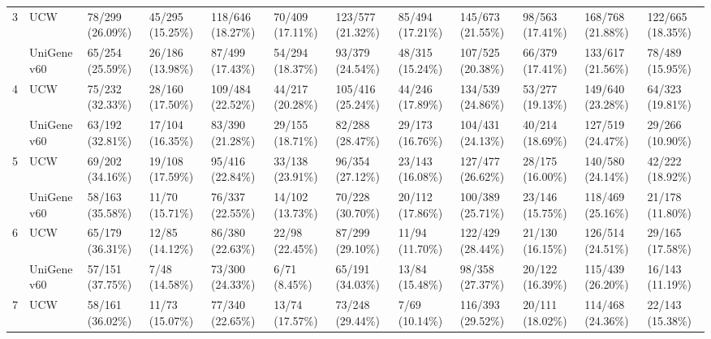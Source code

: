 \begin{sidewaystable}
\begin{localsize}{6}{7}
\begin{tabular}{llp{1cm}p{1cm}p{1cm}p{1cm}p{1cm}p{1cm}p{1cm}p{1cm}p{1cm}p{1cm}}
 \midrule
 3          & UCW         & 78/299 (26.09\%)   & 45/295 (15.25\%)   & 118/646 (18.27\%)   & 70/409 (17.11\%)    & 123/577 (21.32\%)   & 85/494 (17.21\%)    & 145/673 (21.55\%)   & 98/563 (17.41\%)    & 168/768 (21.88\%)          & 122/665 (18.35\%)         \\
            & UniGene v60 & 65/254 (25.59\%)   & 26/186 (13.98\%)   & 87/499 (17.43\%)    & 54/294 (18.37\%)    & 93/379 (24.54\%)    & 48/315 (15.24\%)    & 107/525 (20.38\%)   & 66/379 (17.41\%)    & 133/617 (21.56\%)          & 78/489 (15.95\%)          \\
 \midrule
 4          & UCW         & 75/232 (32.33\%)   & 28/160 (17.50\%)   & 109/484 (22.52\%)   & 44/217 (20.28\%)    & 105/416 (25.24\%)   & 44/246 (17.89\%)    & 134/539 (24.86\%)   & 53/277 (19.13\%)    & 149/640 (23.28\%)          & 64/323 (19.81\%)          \\
            & UniGene v60 & 63/192 (32.81\%)   & 17/104 (16.35\%)   & 83/390 (21.28\%)    & 29/155 (18.71\%)    & 82/288 (28.47\%)    & 29/173 (16.76\%)    & 104/431 (24.13\%)   & 40/214 (18.69\%)    & 127/519 (24.47\%)          & 29/266 (10.90\%)          \\
 \midrule
 5          & UCW         & 69/202 (34.16\%)   & 19/108 (17.59\%)   & 95/416 (22.84\%)    & 33/138 (23.91\%)    & 96/354 (27.12\%)    & 23/143 (16.08\%)    & 127/477 (26.62\%)   & 28/175 (16.00\%)    & 140/580 (24.14\%)          & 42/222 (18.92\%)          \\
            & UniGene v60 & 58/163 (35.58\%)   & 11/70 (15.71\%)    & 76/337 (22.55\%)    & 14/102 (13.73\%)    & 70/228 (30.70\%)    & 20/112 (17.86\%)    & 100/389 (25.71\%)   & 23/146 (15.75\%)    & 118/469 (25.16\%)          & 21/178 (11.80\%)          \\
 \midrule
 6          & UCW         & 65/179 (36.31\%)   & 12/85 (14.12\%)    & 86/380 (22.63\%)    & 22/98 (22.45\%)     & 87/299 (29.10\%)    & 11/94 (11.70\%)     & 122/429 (28.44\%)   & 21/130 (16.15\%)    & 126/514 (24.51\%)          & 29/165 (17.58\%)          \\
            & UniGene v60 & 57/151 (37.75\%)   & 7/48 (14.58\%)     & 73/300 (24.33\%)    & 6/71     (8.45\%)   & 65/191 (34.03\%)    & 13/84 (15.48\%)     & 98/358 (27.37\%)    & 20/122 (16.39\%)    & 115/439 (26.20\%)          & 16/143 (11.19\%)          \\
 \midrule
 7          & UCW         & 58/161 (36.02\%)   & 11/73 (15.07\%)    & 77/340 (22.65\%)    & 13/74 (17.57\%)     & 73/248 (29.44\%)    & 7/69 (10.14\%)      & 116/393 (29.52\%)   & 20/111 (18.02\%)    & 114/468 (24.36\%)          & 22/143 (15.38\%)          \\

\end{tabular}
\end{localsize}
\end{sidewaystable}
